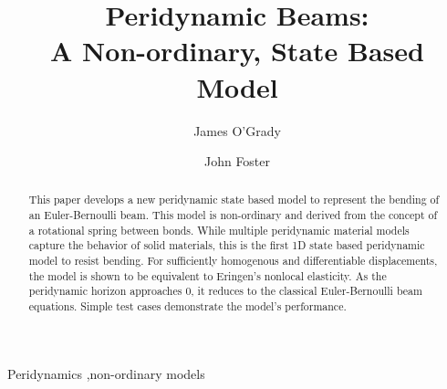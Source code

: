 \documentclass[5p,twocolumn]{elsarticle}
\begin{document}
\begin{frontmatter}

\title{Peridynamic Beams: \\ A Non-ordinary, State Based Model}

\author[utsa]{James O'Grady}

\author[utsa]{John Foster}


\address[utsa]{The University of Texas at San Antonio, One UTSA Circle, San Antonio, TX 78249}

\begin{abstract}
This paper develops a new peridynamic state based model to represent the bending of an Euler-Bernoulli beam.
This model is non-ordinary and derived from the concept of a rotational spring between bonds.
While multiple peridynamic material models capture the behavior of solid materials, this is the first 1D state based peridynamic model to resist bending.
For sufficiently homogenous and differentiable displacements, the model is shown to be equivalent to Eringen's nonlocal elasticity.
As the peridynamic horizon approaches 0, it reduces to the classical Euler-Bernoulli beam equations.
Simple test cases demonstrate the model's performance.
\end{abstract}

\begin{keyword}
Peridynamics \sep non-ordinary models
\end{keyword}

\end{frontmatter}
\end{document}
